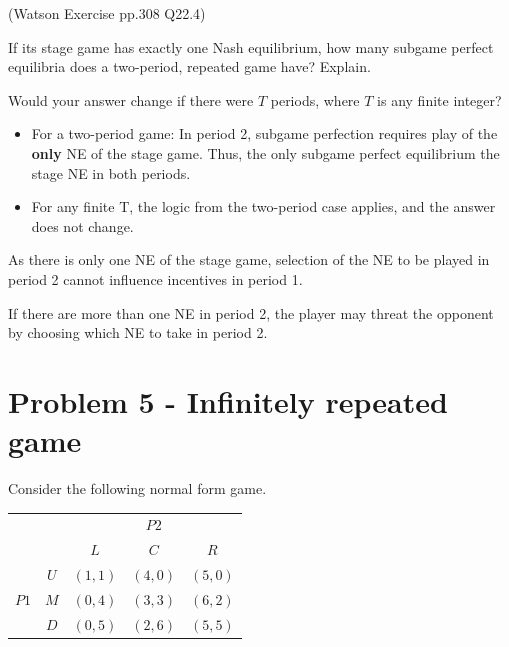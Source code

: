 \documentclass{article}
\begin{document}
(Watson Exercise pp.308 Q22.4)

If its stage game has exactly one Nash equilibrium, how many subgame
perfect equilibria does a two-period, repeated game have? Explain. 

\smallskip

Would your answer change if there were $T$ periods, where $T$ is any finite integer?

\bigskip


\begin{itemize}
\item For a two-period game: In period 2, subgame perfection requires play of the \textbf{only} NE
of the stage game. Thus, the only subgame perfect equilibrium the stage NE in both periods. 

\item For any finite T, the logic from the two-period case applies, and the answer does not
change.

\end{itemize}

\begin{mdframed}[backgroundcolor=blue!20,linecolor=white]
As there is only one NE of the stage game,
selection of the NE to be played in period 2 cannot influence
incentives in period 1.

\medskip 

If there are more than one NE in period 2, 
the player may threat the opponent by choosing which NE to take in period 2.

\end{mdframed}



\section{Problem 5 - Infinitely repeated game}

Consider the following normal form game.

\begin{center}
\label{tab:infi}
\begin{tabular}{cc|c|c|c|}
  & \multicolumn{1}{c}{} & \multicolumn{3}{c}{$P2$}  \\
  & \multicolumn{1}{c}{} & \multicolumn{1}{c}{$L$} & \multicolumn{1}{c}{$C$} & \multicolumn{1}{c}{$R$} \\\cline{3-5}
            & $U$ & $(1,1)$ & $(4,0)$  & $(5,0)$ \\   \cline{3-5}  
      $P1$  & $M$ & $(0,4)$ & $(3,3)$  & $(6,2)$ \\   \cline{3-5}
            & $D$ & $(0,5)$ & $(2,6)$  & $(5,5)$ \\   \cline{3-5}

\end{tabular}
\end{center}
\end{document}
